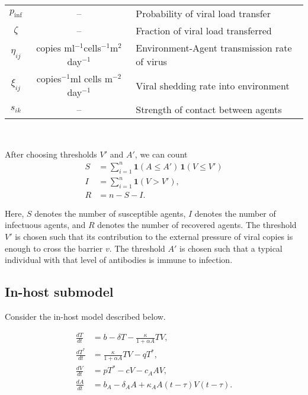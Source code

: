 \documentclass[11pt]{article}
\newcommand{\iv}{$^{-1}$}
\begin{document}
\begin{table}[h!]
\begin{tabular}{ccl}
            $p_\text{inf}$  & --
                                    & Probability of viral load transfer \\
            $\zeta$     & --
                                    & Fraction of viral load transferred \\
            $\eta_{ij}$ & copies ml\iv cells\iv m$^2$ day\iv
                                    & Environment-Agent transmission rate of virus\\
            $\xi_{ij}$  & copies\iv ml cells m$^{-2}$ day\iv
                                    & Viral shedding rate into environment \\
            $s_{ik}$    & --
                                    & Strength of contact between agents \\
            \hline
        \end{tabular}
        \label{tab:parameter}
    \end{table}

    ~

    After choosing thresholds $V'$ and $A'$, we can count \begin{align}
        S &= \sum_{i = 1}^n \mathbf{1}(A \leq A')\, \mathbf{1}(V \leq V') \\
        I &= \sum_{i = 1}^n \mathbf{1}(V > V'), \\
        R &= n - S - I.
    \end{align}

    Here, $S$ denotes the number of susceptible agents, $I$ denotes the number
    of infectuous agents, and $R$ denotes the number of recovered agents. The
    threshold $V'$ is chosen such that its contribution to the external
    pressure of viral copies is enough to cross the barrier $v$. The threshold
    $A'$ is chosen such that a typical individual with that level of
    antibodies is immune to infection.


    \subsection{In-host submodel}

    Consider the in-host model described below.

    \begin{align*}
        \frac{dT}{dt} &= b -  \delta T - \frac{\kappa}{1 + \alpha A} TV, \\
        \frac{dT^*}{dt} &= \frac{\kappa}{1 + \alpha A} TV - qT^*, \\
        \frac{dV}{dt} &= pT^* - cV - c_A AV, \\
        \frac{dA}{dt} &= b_A -  \delta_A A + \kappa_A A(t - \tau)V(t - \tau).
    \end{align*}
\end{document}
